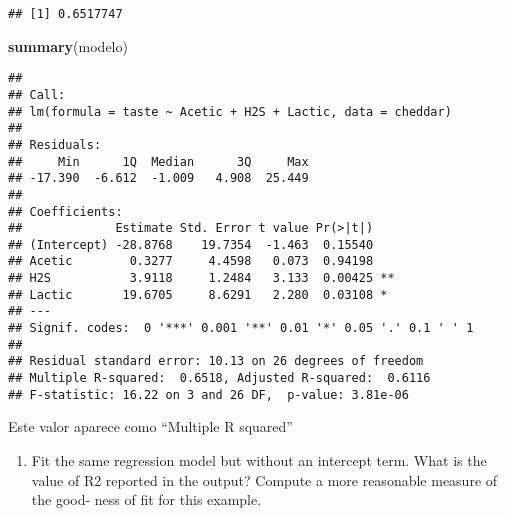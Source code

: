 \documentclass[
]{article}
\newenvironment{Shaded}{\begin{snugshade}}{\end{snugshade}}
\newcommand{\AttributeTok}[1]{\textcolor[rgb]{0.13,0.29,0.53}{#1}}
\newcommand{\DecValTok}[1]{\textcolor[rgb]{0.00,0.00,0.81}{#1}}
\newcommand{\FunctionTok}[1]{\textcolor[rgb]{0.13,0.29,0.53}{\textbf{#1}}}
\newcommand{\NormalTok}[1]{#1}
\newcommand{\OtherTok}[1]{\textcolor[rgb]{0.56,0.35,0.01}{#1}}
\newcommand{\SpecialCharTok}[1]{\textcolor[rgb]{0.81,0.36,0.00}{\textbf{#1}}}
\newcommand{\StringTok}[1]{\textcolor[rgb]{0.31,0.60,0.02}{#1}}
\providecommand{\tightlist}{%
  \setlength{\itemsep}{0pt}\setlength{\parskip}{0pt}}
\begin{document}
\begin{verbatim}
## [1] 0.6517747
\end{verbatim}

\begin{Shaded}
\begin{Highlighting}[]
\FunctionTok{summary}\NormalTok{(modelo)}
\end{Highlighting}
\end{Shaded}

\begin{verbatim}
## 
## Call:
## lm(formula = taste ~ Acetic + H2S + Lactic, data = cheddar)
## 
## Residuals:
##     Min      1Q  Median      3Q     Max 
## -17.390  -6.612  -1.009   4.908  25.449 
## 
## Coefficients:
##             Estimate Std. Error t value Pr(>|t|)   
## (Intercept) -28.8768    19.7354  -1.463  0.15540   
## Acetic        0.3277     4.4598   0.073  0.94198   
## H2S           3.9118     1.2484   3.133  0.00425 **
## Lactic       19.6705     8.6291   2.280  0.03108 * 
## ---
## Signif. codes:  0 '***' 0.001 '**' 0.01 '*' 0.05 '.' 0.1 ' ' 1
## 
## Residual standard error: 10.13 on 26 degrees of freedom
## Multiple R-squared:  0.6518, Adjusted R-squared:  0.6116 
## F-statistic: 16.22 on 3 and 26 DF,  p-value: 3.81e-06
\end{verbatim}

Este valor aparece como ``Multiple R squared''

\begin{enumerate}
\def\labelenumi{(\alph{enumi})}
\setcounter{enumi}{2}
\tightlist
\item
  Fit the same regression model but without an intercept term. What is
  the value of R2 reported in the output? Compute a more reasonable
  measure of the good- ness of fit for this example.
\end{enumerate}

\begin{Shaded}
\end{Shaded}
\end{document}
